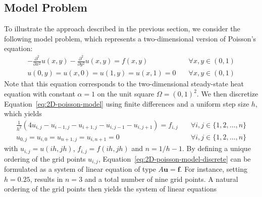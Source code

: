\subsection{Model Problem}
To illustrate the approach described in the previous section, we consider the following model problem, which represents a two-dimensional version of Poisson's equation:
\begin{equation}
	\begin{split}
		-\frac{\partial^2}{\partial x^2} u(x,y) - \frac{\partial^2}{\partial y^2} u(x,y) = f(x, y) \quad & \forall x, y \in (0, 1) \\
		u(0, y) = u(x, 0) = u(1, y) = u(x, 1) = 0 \quad & \forall x, y \in (0, 1)
	\end{split}
	\label{eq:2D-poisson-model}
\end{equation}
Note that this equation corresponds to the two-dimensional steady-state heat equation with constant $\alpha = 1$ on the unit square $\Omega = ( 0, 1 )^2$.
We then discretize Equation~\eqref{eq:2D-poisson-model} using finite differences and a uniform step size $h$, which yields
\begin{equation}
	\begin{split}
		\frac{1}{h^2} (4 u_{i,j} - u_{i-1, j} - u_{i+1, j} - u_{i, j-1} - u_{i, j+1}) = f_{i, j} \quad & \forall i, j \in \{1, 2, \dots, n\} \\
		u_{0, j} = u_{i, 0} = u_{n+1, j} = u_{i, n+1} = 0 \quad & \forall i, j \in \{1, 2, \dots, n\}
	\end{split} 
	\label{eq:2D-poisson-model-discrete}
\end{equation}
with $u_{i,j} = u(ih, jh)$, $f_{i,j} = f(ih, jh)$ and $n = 1/h - 1$.
By defining a unique ordering of the grid points $u_{i, j}$, Equation~\eqref{eq:2D-poisson-model-discrete} can be formulated as a system of linear equation of type $A \bm{u} = \bm{f}$. 
For instance, setting $h = 0.25$, results in $n = 3$ and a total number of nine grid points.
A natural ordering of the grid points then yields the system of linear equations
